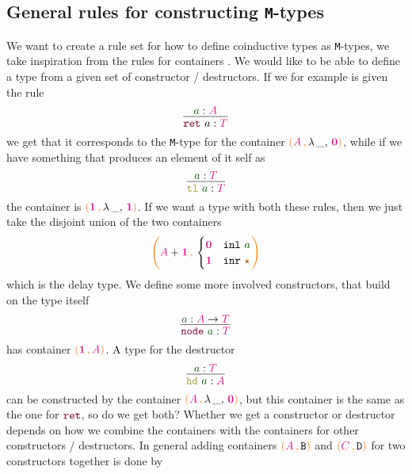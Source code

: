 \documentclass[twoside,11pt,openright]{report}
\theoremstyle{plain} %
\theoremstyle{definition}
\theoremstyle{remark}
\newcommand*{\term}[1]{\textcolor{green!30!black}{#1}} %
\newcommand*{\type}[1]{\textcolor{magenta!90!black}{#1}}
\newcommand*{\containerpair}[2]{\ensuremath{\colorlet{savedleftcolor}{.}\color{orange}\left(\color{savedleftcolor}#1\,\textcolor{orange}{\mathbf{,}}\,#2\color{orange}\right)\color{savedleftcolor}}}
\newcommand*{\containerpairsimple}[2]{\containerpair{#1}{\lambda\,\_,\,#2}}
\newcommand*{\unit}{\type{\textbf{1}}}
\newcommand*{\empt}{\type{\textbf{0}}}
\newcommand*{\constant}[1]{\textcolor{orange!60!black}{\ensuremath{\mathtt{#1}}}}
\newcommand*{\constructor}[1]{\textcolor{purple!60!black}{\ensuremath{\mathtt{#1}}}}
\newcommand*{\destructor}[1]{\textcolor{yellow!60!black}{\ensuremath{\mathtt{#1}}}}
\newcommand*{\typeformer}[1]{\ensuremath{\mathtt{#1}}}
\newcommand*{\unitelem}{\constant{\star}} %
\begin{document}
\subsection{General rules for constructing \texttt{M}-types}
We want to create a rule set for how to define coinductive types as \texttt{M}-types, we take inspiration from the rules for containers \cite{DBLP:DiffContainer}. We would like to be able to define a type from a given set of constructor / destructors. If we for example is given the rule
\begin{equation}
  \vcenter{\infer{\constructor{ret}~a : \type{T}}{\term{a} : \type{A}}}
\end{equation}
we get that it corresponds to the \texttt{M}-type for the container \(\containerpairsimple{\type{A}}{\empt}\), while if we have something that produces an element of it self as
\begin{equation}
  \vcenter{\infer{\destructor{tl}~\term{a} : \type{T}}{\term{a} : \type{T}}}
\end{equation}
the container is \(\containerpairsimple{\unit}{\unit}\). If we want a type with both these rules, then we just take the disjoint union of the two containers
\begin{equation}
  \containerpair{\type{A} + \unit}{\begin{cases} \empt & \mathtt{inl}~\term{a} \\ \unit & \mathtt{inr}~\unitelem \end{cases}}
\end{equation}
which is the delay type. We define some more involved constructors, that build on the type itself
\begin{equation}
  \vcenter{\infer{\constructor{node}~\term{a} : \type{T}}{\term{a} : \type{A} \rightarrow \type{T}}}
\end{equation}
has container \(\containerpair{\unit}{\type{A}}\). A type for the destructor
\begin{equation}
  \vcenter{\infer{\destructor{hd}~\term{a} : \type{A}}{\term{a} : \type{T}}}
\end{equation}
can be constructed by the container \(\containerpairsimple{\type{A}}{\empt}\), but this container is the same as the one for \(\constructor{ret}\), so do we get both? Whether we get a constructor or destructor depends on how we combine the containers with the containers for other constructors / destructors. In general adding containers \(\containerpair{\type{A}}{\typeformer{B}}\) and \(\containerpair{\type{C}}{\typeformer{D}}\) for two constructors together is done by
\end{document}

